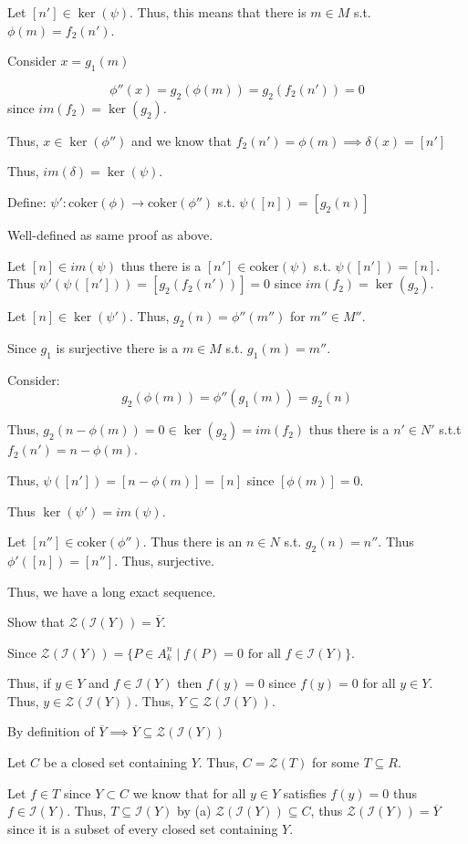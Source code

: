 \documentclass[12pt, letterpaper]{article}
\renewcommand{\t}[1]{\text{#1}}
\newcommand{\coker}{\mathrm{coker}}
\begin{document}
\begin{problemproof}
    Let $[n'] \in \ker(\psi)$. Thus, this means that there is $m \in M$ s.t. $\phi(m)=f_2(n')$.

    Consider $x=g_1(m)$

    \[\phi''(x)=g_2(\phi(m))=g_2(f_2(n'))=0\]
    since $im(f_2)=\ker(g_2)$.

    Thus, $x \in \ker(\phi'')$ and we know that $f_2(n')=\phi(m) \implies \delta(x)=[n']$

    Thus, $im(\delta)=\ker(\psi)$.

    Define: $\psi': \coker(\phi) \to \coker(\phi'')$ s.t. $\psi([n])=[g_2(n)]$

    Well-defined as same proof as above.

    Let $[n] \in im(\psi)$ thus there is a $[n'] \in \coker(\psi)$ s.t. $\psi([n'])=[n]$. Thus $\psi'(\psi([n']))=[g_2(f_2(n'))]=0$ since $im(f_2)=\ker(g_2)$.

    Let $[n] \in \ker(\psi')$. Thus, $g_2(n)=\phi''(m'')$ for $m'' \in M''$.

    Since $g_1$ is surjective there is a $m \in M$ s.t. $g_1(m)=m''$.

    Consider:
    \[g_2(\phi(m))=\phi''(g_1(m))=g_2(n)\]

    Thus, $g_2(n-\phi(m))=0 \in \ker(g_2)=im(f_2)$ thus there is a $n' \in N'$ s.t.t $f_2(n')=n-\phi(m)$.

    Thus, $\psi([n'])=[n-\phi(m)]=[n]$ since $[\phi(m)]=0$.

    Thus $\ker(\psi')=im(\psi)$.

    Let $[n''] \in \coker(\phi'')$. Thus there is an $n \in N$ s.t. $g_2(n)=n''$. Thus $\phi'([n])=[n'']$. Thus, surjective.

    Thus, we have a long exact sequence.
\end{problemproof}

\addtocounter{subproblemcounter}{4}
\begin{problem}{}
    Show that $\mathcal{Z} (\mathcal{I} (Y)) = \overline{Y}$.
\end{problem}
\begin{problemproof}
    Since $\mathcal{Z}(\mathcal{I}(Y))=\{P \in A_k^n \mid f(P)=0 \t{ for all } f \in \mathcal{I}(Y)\}$.
    
    Thus, if $y \in Y$ and $f \in \mathcal{I}(Y)$ then $f(y)=0$ since $f(y)=0$ for all $y \in Y$. Thus, $y \in \mathcal{Z}(\mathcal{I}(Y))$. Thus, $Y \subseteq \mathcal{Z}(\mathcal{I}(Y))$.

    By definition of $\overline{Y} \implies \overline{Y} \subseteq \mathcal{Z}(\mathcal{I}(Y))$

    Let $C$ be a closed set containing $Y$. Thus, $C=\mathcal{Z}(T)$ for some $T \subseteq R$.

    Let $f \in T$ since $Y \subset C$ we know that for all $y \in Y$ satisfies $f(y)=0$ thus $f \in \mathcal{I}(Y)$. Thus, $T \subseteq \mathcal{I}(Y)$ by (a) $\mathcal{Z}(\mathcal{I}(Y)) \subseteq C$, thus $\mathcal{Z}(\mathcal{I}(Y))=\overline{Y}$ since it is a subset of every closed set containing $Y$.
\end{problemproof}
\end{document}
